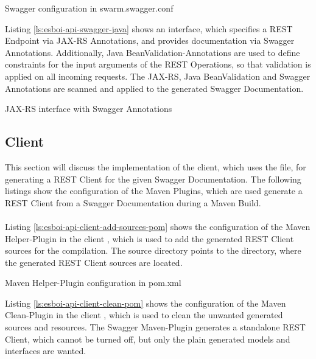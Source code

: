 \begin{listing}[h]
	\caption{Swagger configuration in swarm.swagger.conf}
	\label{ls:esboi-api-swagger-conf}
\end{listing}

Listing \vref{ls:esboi-api-swagger-java} shows an interface, which specifies a REST Endpoint via JAX-RS Annotations, and provides documentation via Swagger Annotations. Additionally, Java BeanValidation-Annotations are used to define constraints for the input arguments of the REST Operations, so that validation is applied on all incoming requests. The JAX-RS, Java BeanValidation and Swagger Annotations are scanned and applied to the generated Swagger Documentation.

\begin{listing}[h]
	\caption{JAX-RS interface with Swagger Annotations}
	\label{ls:esboi-api-swagger-java}
\end{listing}

\subsection{Client}
\label{sec:esbi-api-client}
This section will discuss the implementation of the client, which uses the  file, for generating a REST Client for the given Swagger Documentation. The following listings show the configuration of the Maven Plugins, which are used generate a REST Client from a Swagger Documentation during a Maven Build.
\\ \\
Listing \vref{ls:esboi-api-client-add-sources-pom} shows the configuration of the Maven Helper-Plugin in the client  , which is used to add the generated REST Client sources for the compilation. The source directory points to the directory, where the generated REST Client sources are located.
\newpage 

\begin{listing}[h]
	\caption{Maven Helper-Plugin configuration in pom.xml}
	\label{ls:esboi-api-client-add-sources-pom}
\end{listing}

Listing \vref{ls:esboi-api-client-clean-pom} shows the configuration of the Maven Clean-Plugin in the client  , which is used to clean the unwanted generated sources and resources. The Swagger Maven-Plugin generates a standalone REST Client, which cannot be turned off, but only the plain generated models and interfaces are wanted. 


